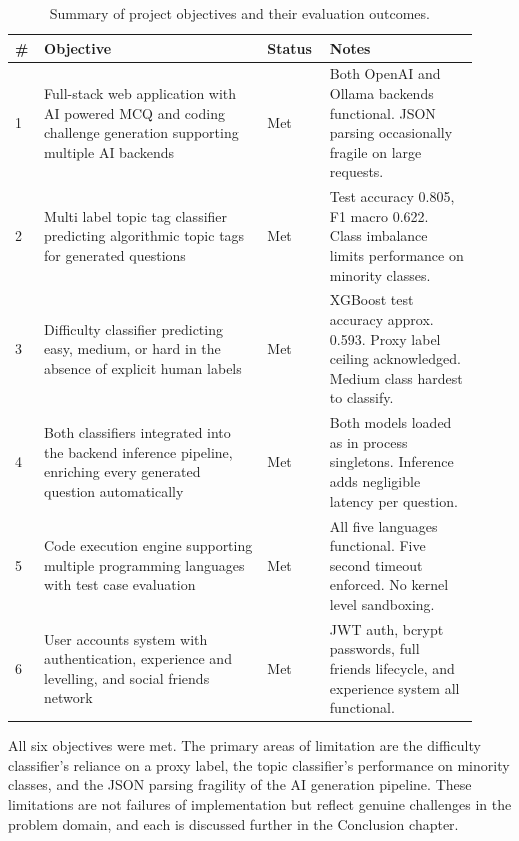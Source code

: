 \begin{table}[H]
    \centering
    \renewcommand{\arraystretch}{1.4}
    \begin{tabular}{p{0.05\linewidth} p{0.45\linewidth} p{0.12\linewidth}
        p{0.30\linewidth}}
        \hline
        \textbf{\#} & \textbf{Objective} & \textbf{Status} &
        \textbf{Notes} \\
        \hline
        1 & Full-stack web application with AI powered MCQ and coding
            challenge generation supporting multiple AI backends
          & Met
          & Both OpenAI and Ollama backends functional. JSON parsing
            occasionally fragile on large requests. \\
        2 & Multi label topic tag classifier predicting algorithmic
            topic tags for generated questions
          & Met
          & Test accuracy 0.805, F1 macro 0.622. Class imbalance limits
            performance on minority classes. \\
        3 & Difficulty classifier predicting easy, medium, or hard in
            the absence of explicit human labels
          & Met
          & XGBoost test accuracy approx. 0.593. Proxy label ceiling
            acknowledged. Medium class hardest to classify. \\
        4 & Both classifiers integrated into the backend inference
            pipeline, enriching every generated question automatically
          & Met
          & Both models loaded as in process singletons. Inference
            adds negligible latency per question. \\
        5 & Code execution engine supporting multiple programming
            languages with test case evaluation
          & Met
          & All five languages functional. Five second timeout
            enforced. No kernel level sandboxing. \\
        6 & User accounts system with authentication, experience and
            levelling, and social friends network
          & Met
          & JWT auth, bcrypt passwords, full friends lifecycle, and
            experience system all functional. \\
        \hline
    \end{tabular}
    \caption{Summary of project objectives and their evaluation
    outcomes.}
    \label{table:objectives-summary}
\end{table}

All six objectives were met. The primary areas of limitation are the
difficulty classifier's reliance on a proxy label, the topic
classifier's performance on minority classes, and the JSON parsing
fragility of the AI generation pipeline. These limitations are not
failures of implementation but reflect genuine challenges in the
problem domain, and each is discussed further in the Conclusion
chapter.